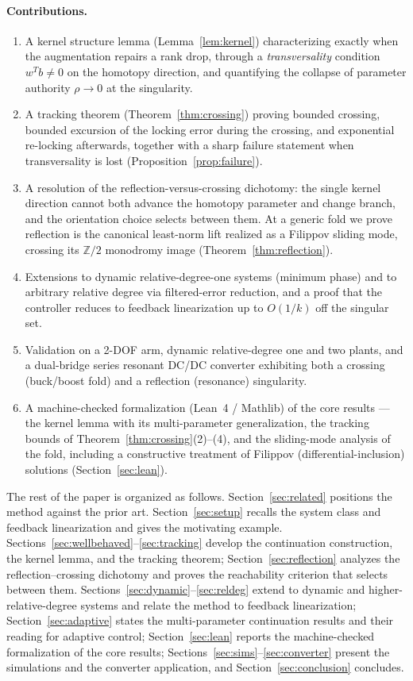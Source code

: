 \documentclass[11pt,american]{article}
\theoremstyle{definition}
\theoremstyle{plain}
\theoremstyle{remark}
\begin{document}
\paragraph{Contributions.} 
\begin{enumerate}
\item A kernel structure lemma (Lemma~\ref{lem:kernel}) characterizing exactly when the augmentation repairs a rank drop, through a \emph{transversality} condition $w^Tb \ne 0$ on the homotopy direction, and quantifying the collapse of parameter authority $\rho \to 0$ at the singularity.
\item A tracking theorem (Theorem~\ref{thm:crossing}) proving bounded crossing, bounded excursion of the locking error during the crossing, and exponential re-locking afterwards, together with a sharp failure statement when transversality is lost (Proposition~\ref{prop:failure}).
\item A resolution of the reflection-versus-crossing dichotomy: the single kernel direction cannot both advance the homotopy parameter and change branch, and the orientation choice selects between them. At a generic fold we prove reflection is the canonical least-norm lift realized as a Filippov sliding mode, crossing its $\mathbb Z/2$ monodromy image (Theorem~\ref{thm:reflection}).
\item Extensions to dynamic relative-degree-one systems (minimum phase) and to arbitrary relative degree via filtered-error reduction, and a proof that the controller reduces to feedback linearization up to $O(1/k)$ off the singular set.
\item Validation on a 2-DOF arm, dynamic relative-degree one and two plants, and a dual-bridge series resonant DC/DC converter exhibiting both a crossing (buck/boost fold) and a reflection (resonance) singularity.
\item A machine-checked formalization (Lean~4 / Mathlib) of the core results --- the kernel lemma with its multi-parameter generalization, the tracking bounds of Theorem~\ref{thm:crossing}(2)--(4), and the sliding-mode analysis of the fold, including a constructive treatment of Filippov (differential-inclusion) solutions (Section~\ref{sec:lean}).
\end{enumerate}

The rest of the paper is organized as follows. Section~\ref{sec:related} positions the method against the prior art. Section~\ref{sec:setup} recalls the system class and feedback linearization and gives the motivating example. Sections~\ref{sec:wellbehaved}--\ref{sec:tracking} develop the continuation construction, the kernel lemma, and the tracking theorem; Section~\ref{sec:reflection} analyzes the reflection--crossing dichotomy and proves the reachability criterion that selects between them. Sections~\ref{sec:dynamic}--\ref{sec:reldeg} extend to dynamic and higher-relative-degree systems and relate the method to feedback linearization; Section~\ref{sec:adaptive} states the multi-parameter continuation results and their reading for adaptive control; Section~\ref{sec:lean} reports the machine-checked formalization of the core results; Sections~\ref{sec:sims}--\ref{sec:converter} present the simulations and the converter application, and Section~\ref{sec:conclusion} concludes.
\end{document}
